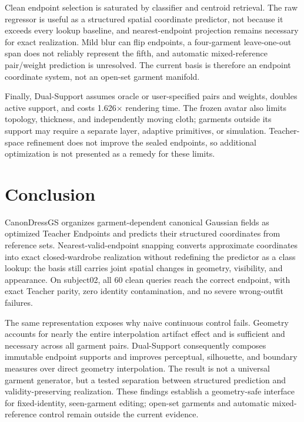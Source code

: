 \documentclass[letterpaper]{article}
\newcommand{\method}{CanonDressGS}
\newcommand{\dual}{Dual-Support}
\begin{document}
Clean endpoint selection is saturated by classifier and centroid retrieval. The raw regressor is useful as a structured spatial coordinate predictor, not because it exceeds every lookup baseline, and nearest-endpoint projection remains necessary for exact realization. Mild blur can flip endpoints, a four-garment leave-one-out span does not reliably represent the fifth, and automatic mixed-reference pair/weight prediction is unresolved. The current basis is therefore an endpoint coordinate system, not an open-set garment manifold.

Finally, \dual{} assumes oracle or user-specified pairs and weights, doubles active support, and costs 1.626$\times$ rendering time. The frozen avatar also limits topology, thickness, and independently moving cloth; garments outside its support may require a separate layer, adaptive primitives, or simulation.
Teacher-space refinement does not improve the sealed endpoints, so additional optimization is not presented as a remedy for these limits.

\section{Conclusion}

\method{} organizes garment-dependent canonical Gaussian fields as optimized Teacher Endpoints and predicts their structured coordinates from reference sets. Nearest-valid-endpoint snapping converts approximate coordinates into exact closed-wardrobe realization without redefining the predictor as a class lookup: the basis still carries joint spatial changes in geometry, visibility, and appearance. On subject02, all 60 clean queries reach the correct endpoint, with exact Teacher parity, zero identity contamination, and no severe wrong-outfit failures.

The same representation exposes why naive continuous control fails. Geometry accounts for nearly the entire interpolation artifact effect and is sufficient and necessary across all garment pairs. \dual{} consequently composes immutable endpoint supports and improves perceptual, silhouette, and boundary measures over direct geometry interpolation. The result is not a universal garment generator, but a tested separation between structured prediction and validity-preserving realization. These findings establish a geometry-safe interface for fixed-identity, seen-garment editing; open-set garments and automatic mixed-reference control remain outside the current evidence.


\end{document}
